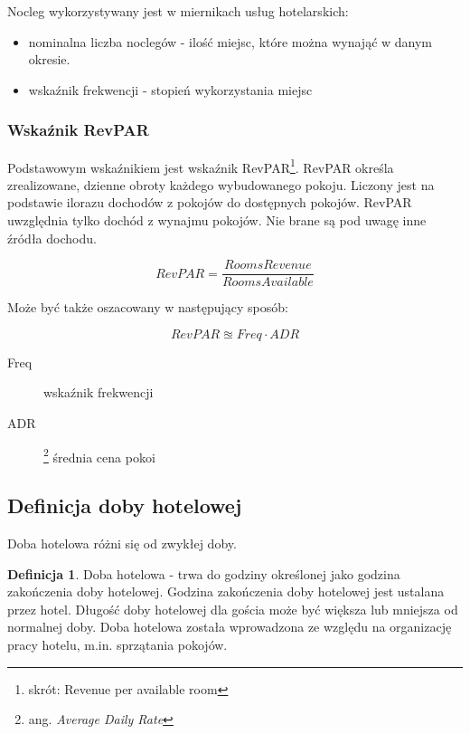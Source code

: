 \documentclass[a4paper,onecolumn,oneside,11pt,wide,floatssmall]{mwrep}
\theoremstyle{definition}
\newtheorem{defn}{Definicja}[section]
\theoremstyle{plain}%
\theoremstyle{remark}
\begin{document}
Nocleg wykorzystywany jest w miernikach usług hotelarskich:
\begin{itemize}
  \item nominalna liczba noclegów - ilość miejsc, które można wynająć w danym okresie.
  \item wskaźnik frekwencji - stopień wykorzystania miejsc
\end{itemize}

\subsubsection{Wskaźnik RevPAR}
Podstawowym wskaźnikiem jest wskaźnik RevPAR\footnote{skrót: Revenue per available room}. RevPAR określa zrealizowane, 
dzienne obroty każdego wybudowanego pokoju. Liczony jest na podstawie
 ilorazu dochodów z pokojów do dostępnych pokojów. RevPAR uwzględnia tylko 
 dochód z wynajmu pokojów. Nie brane są pod uwagę inne źródła dochodu.

\begin{equation}
RevPAR = \frac{Rooms Revenue}{Rooms Available}
\end{equation}

Może być także oszacowany w następujący sposób:

\begin{equation}
RevPAR \approxeq Freq \cdot ADR
\end{equation}

\begin{description}
  \item[Freq] wskaźnik frekwencji
  \item[ADR]\footnote{ang. {\em Average Daily Rate} } średnia cena pokoi
\end{description}

\subsection{Definicja doby hotelowej}
Doba hotelowa różni się od zwykłej doby.

\begin{defn}{Doba hotelowa} - trwa do godziny określonej jako godzina zakończenia doby 
hotelowej. Godzina zakończenia doby hotelowej jest ustalana przez hotel.
 Długość doby hotelowej dla gościa może być większa lub mniejsza 
od normalnej doby. Doba hotelowa została wprowadzona ze względu na 
organizację pracy hotelu, m.in. sprzątania pokojów.

\end{defn}
\end{document}
